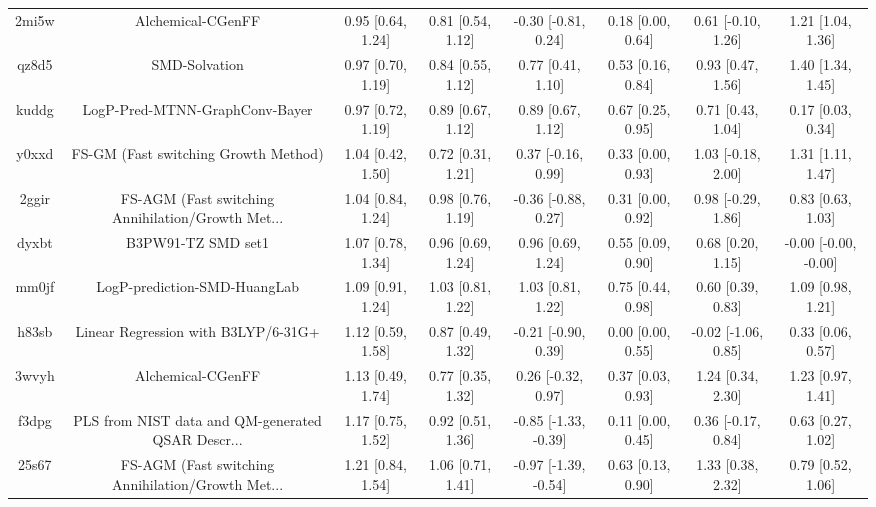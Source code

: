 \documentclass{article}
\begin{document}
\begin{center}
\begin{longtable}{|cccccccc|}
 2mi5w &                                  Alchemical-CGenFF &  0.95 [0.64, 1.24] &  0.81 [0.54, 1.12] &   -0.30 [-0.81, 0.24] &  0.18 [0.00, 0.64] &   0.61 [-0.10, 1.26] &     1.21 [1.04, 1.36] \\
 qz8d5 &                                      SMD-Solvation &  0.97 [0.70, 1.19] &  0.84 [0.55, 1.12] &     0.77 [0.41, 1.10] &  0.53 [0.16, 0.84] &    0.93 [0.47, 1.56] &     1.40 [1.34, 1.45] \\
 kuddg &                     LogP-Pred-MTNN-GraphConv-Bayer &  0.97 [0.72, 1.19] &  0.89 [0.67, 1.12] &     0.89 [0.67, 1.12] &  0.67 [0.25, 0.95] &    0.71 [0.43, 1.04] &     0.17 [0.03, 0.34] \\
 y0xxd &               FS-GM (Fast switching Growth Method) &  1.04 [0.42, 1.50] &  0.72 [0.31, 1.21] &    0.37 [-0.16, 0.99] &  0.33 [0.00, 0.93] &   1.03 [-0.18, 2.00] &     1.31 [1.11, 1.47] \\
 2ggir &  FS-AGM (Fast switching Annihilation/Growth Met... &  1.04 [0.84, 1.24] &  0.98 [0.76, 1.19] &   -0.36 [-0.88, 0.27] &  0.31 [0.00, 0.92] &   0.98 [-0.29, 1.86] &     0.83 [0.63, 1.03] \\
 dyxbt &                                 B3PW91-TZ SMD set1 &  1.07 [0.78, 1.34] &  0.96 [0.69, 1.24] &     0.96 [0.69, 1.24] &  0.55 [0.09, 0.90] &    0.68 [0.20, 1.15] &  -0.00 [-0.00, -0.00] \\
 mm0jf &                       LogP-prediction-SMD-HuangLab &  1.09 [0.91, 1.24] &  1.03 [0.81, 1.22] &     1.03 [0.81, 1.22] &  0.75 [0.44, 0.98] &    0.60 [0.39, 0.83] &     1.09 [0.98, 1.21] \\
 h83sb &                Linear Regression with B3LYP/6-31G+ &  1.12 [0.59, 1.58] &  0.87 [0.49, 1.32] &   -0.21 [-0.90, 0.39] &  0.00 [0.00, 0.55] &  -0.02 [-1.06, 0.85] &     0.33 [0.06, 0.57] \\
 3wvyh &                                  Alchemical-CGenFF &  1.13 [0.49, 1.74] &  0.77 [0.35, 1.32] &    0.26 [-0.32, 0.97] &  0.37 [0.03, 0.93] &    1.24 [0.34, 2.30] &     1.23 [0.97, 1.41] \\
 f3dpg &  PLS from NIST data and QM-generated QSAR Descr... &  1.17 [0.75, 1.52] &  0.92 [0.51, 1.36] &  -0.85 [-1.33, -0.39] &  0.11 [0.00, 0.45] &   0.36 [-0.17, 0.84] &     0.63 [0.27, 1.02] \\
 25s67 &  FS-AGM (Fast switching Annihilation/Growth Met... &  1.21 [0.84, 1.54] &  1.06 [0.71, 1.41] &  -0.97 [-1.39, -0.54] &  0.63 [0.13, 0.90] &    1.33 [0.38, 2.32] &     0.79 [0.52, 1.06] \\

\end{longtable}
\end{center}
\end{document}
